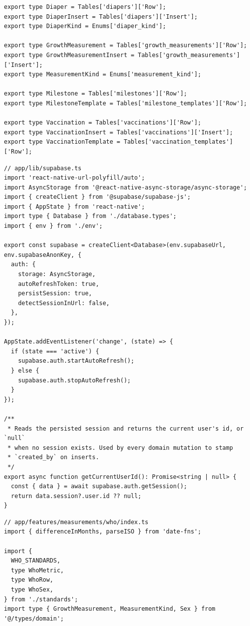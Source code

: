 \documentclass[%
  ukrainian, utf8, columnvii, simple,
  hpadding=10mm, vpadding=10mm, reduceheight=2mm,
  floatsection,
]{eskdtext}
\begin{document}
{\begin{verbatim}
export type Diaper = Tables['diapers']['Row'];
export type DiaperInsert = Tables['diapers']['Insert'];
export type DiaperKind = Enums['diaper_kind'];

export type GrowthMeasurement = Tables['growth_measurements']['Row'];
export type GrowthMeasurementInsert = Tables['growth_measurements']['Insert'];
export type MeasurementKind = Enums['measurement_kind'];

export type Milestone = Tables['milestones']['Row'];
export type MilestoneTemplate = Tables['milestone_templates']['Row'];

export type Vaccination = Tables['vaccinations']['Row'];
export type VaccinationInsert = Tables['vaccinations']['Insert'];
export type VaccinationTemplate = Tables['vaccination_templates']['Row'];
\end{verbatim}

\begin{verbatim}
// app/lib/supabase.ts
import 'react-native-url-polyfill/auto';
import AsyncStorage from '@react-native-async-storage/async-storage';
import { createClient } from '@supabase/supabase-js';
import { AppState } from 'react-native';
import type { Database } from './database.types';
import { env } from './env';

export const supabase = createClient<Database>(env.supabaseUrl, env.supabaseAnonKey, {
  auth: {
    storage: AsyncStorage,
    autoRefreshToken: true,
    persistSession: true,
    detectSessionInUrl: false,
  },
});

AppState.addEventListener('change', (state) => {
  if (state === 'active') {
    supabase.auth.startAutoRefresh();
  } else {
    supabase.auth.stopAutoRefresh();
  }
});

/**
 * Reads the persisted session and returns the current user's id, or `null`
 * when no session exists. Used by every domain mutation to stamp
 * `created_by` on inserts.
 */
export async function getCurrentUserId(): Promise<string | null> {
  const { data } = await supabase.auth.getSession();
  return data.session?.user.id ?? null;
}
\end{verbatim}

\begin{verbatim}
// app/features/measurements/who/index.ts
import { differenceInMonths, parseISO } from 'date-fns';

import {
  WHO_STANDARDS,
  type WhoMetric,
  type WhoRow,
  type WhoSex,
} from './standards';
import type { GrowthMeasurement, MeasurementKind, Sex } from '@/types/domain';


\end{verbatim}}
\end{document}
